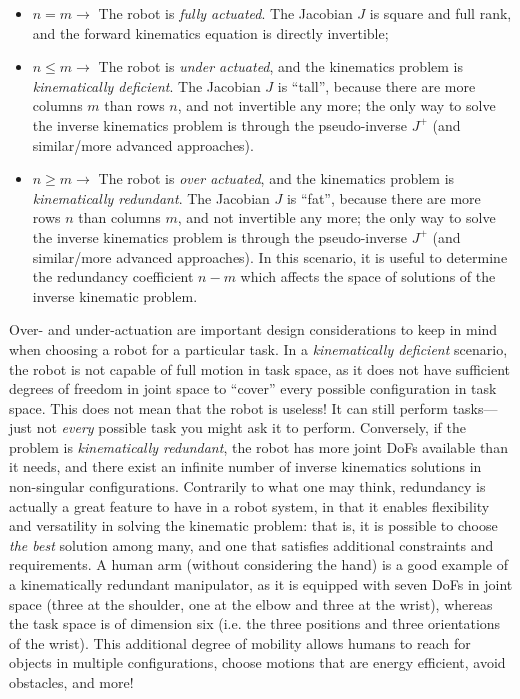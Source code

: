 \begin{itemize}
\item $n   =  m \rightarrow$ The robot is \textsl{fully actuated}. The Jacobian $J$ is square and full rank, and the forward kinematics equation is directly invertible;
\item $n \leq m \rightarrow$ The robot is \textsl{under actuated}, and the kinematics problem is \textsl{kinematically deficient}. The Jacobian $J$ is ``tall'', because there are more columns $m$ than rows $n$, and not invertible any more; the only way to solve the inverse kinematics problem is through the pseudo-inverse $J^+$ (and similar/more advanced approaches).
\item $n \geq m \rightarrow$ The robot is \textsl{over actuated}, and the kinematics problem is \textsl{kinematically redundant}. The Jacobian $J$ is ``fat'', because there are more rows $n$ than columns $m$, and not invertible any more; the only way to solve the inverse kinematics problem is through the pseudo-inverse $J^+$ (and similar/more advanced approaches). In this scenario, it is useful to determine the redundancy coefficient $n-m$ which affects the space of solutions of the inverse kinematic problem.
\end{itemize}

Over- and under-actuation are important design considerations to keep in mind when choosing a robot for a particular task.
In a \textsl{kinematically deficient} scenario, the robot is not capable of full motion in task space, as it does not have sufficient degrees of freedom in joint space to ``cover'' every possible configuration in task space. This does not mean that the robot is useless! It can still perform tasks---just not \textsl{every} possible task you might ask it to perform.
Conversely, if the problem is \textsl{kinematically redundant}, the robot has more joint DoFs available than it needs, and there exist an infinite number of inverse kinematics solutions in non-singular configurations.
Contrarily to what one may think, redundancy is actually a great feature to have in a robot system, in that it enables flexibility and versatility in solving the kinematic problem: that is, it is possible to choose \textsl{the best} solution among many, and one that satisfies additional constraints and requirements.
A human arm (without considering the hand) is a good example of a kinematically redundant manipulator, as it is equipped with seven DoFs in joint space (three at the shoulder, one at the elbow and three at the wrist), whereas the task space is of dimension six (i.e. the three positions and three orientations of the wrist).
This additional degree of mobility allows humans to reach for objects in multiple configurations, choose motions that are energy efficient, avoid obstacles, and more!
